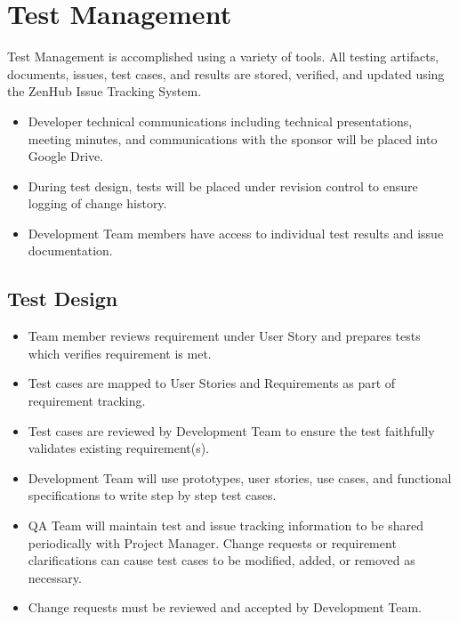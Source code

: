\documentclass[letterpaper,10pt,english,openany,oneside]{sphinxmanual}
\begin{document}
\section{Test Management}
\label{\detokenize{test_plan/test_management:test-management}}\label{\detokenize{test_plan/test_management::doc}}
Test Management is accomplished using a variety of tools. All testing artifacts, documents, issues, test cases, and results are stored, verified, and updated using the ZenHub Issue Tracking System.
\begin{itemize}
\item {} 
Developer technical communications including technical presentations, meeting minutes, and communications with the sponsor will be placed into Google Drive.

\item {} 
During test design, tests will be placed under revision control to ensure logging of change history.

\item {} 
Development Team members have access to individual test results and issue documentation.

\end{itemize}


\subsection{Test Design}
\label{\detokenize{test_plan/test_management:test-design}}\begin{itemize}
\item {} 
Team member reviews requirement under User Story and prepares tests which verifies requirement is met.

\item {} 
Test cases are mapped to User Stories and Requirements as part of requirement tracking.

\item {} 
Test cases are reviewed by Development Team to ensure the test faithfully validates existing requirement(s).

\item {} 
Development Team will use prototypes, user stories, use cases, and functional specifications to write step by step test cases.

\item {} 
QA Team will maintain test and issue tracking information to be shared periodically with Project Manager. Change requests or requirement clarifications can cause test cases to be modified, added, or removed as necessary.

\item {} 
Change requests must be reviewed and accepted by Development Team.

\end{itemize}
\end{document}

